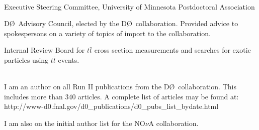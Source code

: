 \documentclass[amsmath,amssymb]{revtex4}
\def\dzero{D\O}
\begin{document}
\\
\begin{list}{}
            {\setlength{\itemsep}{0.0in}\setlength{\parsep}{0.0in}
             \addtolength{\parskip}{-0.5in}}
\item Executive Steering Committee, University of Minnesota Postdoctoral Association
\item \dzero~Advisory Council, elected by the \dzero~collaboration.  Provided
  advice to spokespersons on a variety of topics of import to the collaboration.
\item Internal Review Board for $t{\bar t}$ cross section measurements and
  searches for exotic particles using $t{\bar t}$ events.
\end{list}

{} \\

I am an author on all Run II publications from the \dzero\ collaboration. This includes
more than 340 articles.  A complete list of articles may be found at:
http://www-d0.fnal.gov/d0\_publications/d0\_pubs\_list\_bydate.html

I am also on the initial author list for the NO$\nu$A collaboration.\\



%
%
\newpage
{}
\end{document}
